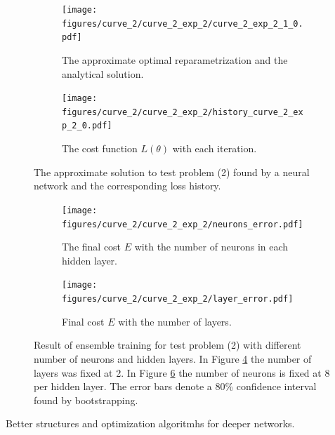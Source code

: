 \begin{figure}[t]\label{fig:curve_2_example}
    \begin{subfigure}[t]{0.5\textwidth}\label{fig:curve_2_solution}
        \centering
        \texttt{[image: figures/curve\_2/curve\_2\_exp\_2/curve\_2\_exp\_2\_1\_0.pdf]}
        \caption{The approximate optimal reparametrization and the analytical solution.}
    \end{subfigure}
    \begin{subfigure}[t]{0.5\textwidth}\label{fig:curve_2_history}
        \centering
        \texttt{[image: figures/curve\_2/curve\_2\_exp\_2/history\_curve\_2\_exp\_2\_0.pdf]}
        \caption{The cost function \(L(\theta)\) with each iteration.}
    \end{subfigure}
    \caption{The approximate solution to test problem (2) found by a neural network and the corresponding loss history.}
\end{figure}

\begin{figure}[t]\label{fig:curve_2_parmas_eks}
    \begin{subfigure}[t]{0.5\textwidth}
        \centering
        \texttt{[image: figures/curve\_2/curve\_2\_exp\_2/neurons\_error.pdf]}
        \caption{The final cost \(E\) with the number of neurons in each hidden layer.}
        \label{fig:curve_2_neuron_error}
    \end{subfigure}
    \begin{subfigure}[t]{0.5\textwidth}
        \centering
        \texttt{[image: figures/curve\_2/curve\_2\_exp\_2/layer\_error.pdf]}
        \caption{Final cost \(E\) with the number of layers.}
        \label{fig:curve_2_layer_error}
    \end{subfigure}
    \caption{Result of ensemble training for test problem (2) with different number of neurons and hidden layers. In Figure \ref{fig:curve_2_neuron_error} the number of layers was fixed at 2. In Figure \ref{fig:curve_2_layer_error} the number of neurons is fixed at 8 per hidden layer. The error bars denote a 80\% confidence interval found by bootstrapping.}
\end{figure}


Better structures and optimization algoritmhs for deeper networks.
